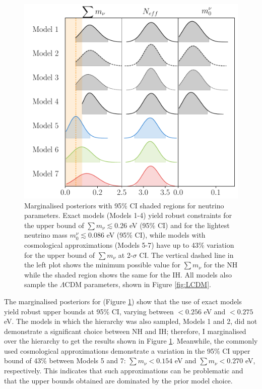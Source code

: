 \begin{figure}
\begin{center}
\includegraphics[scale=0.80]{Neutrino-FIGS/neutrino_prior_models.pdf}
\caption[Results for neutrino related parameters from the neutrino model prior analysis.]{Marginalised posteriors with 95\% CI shaded regions for neutrino parameters. Exact models (Models 1-4) yield  robust constraints for the upper bound of $\sum m_{\nu} \lesssim 0.26$ eV (95\% CI) and for the lightest neutrino mass $m_0^{\nu} \lesssim 0.086$ eV (95\% CI), while models with cosmological approximations (Models 5-7) have up to 43\% variation for the upper bound of $\sum m_{\nu}$ at 2-$\sigma$ CI. The vertical dashed line in the left plot shows the minimum possible value for $\sum m_{\nu}$ for the NH while the shaded region shows the same for the IH. All models also sample the $\Lambda$CDM parameters, shown in Figure \ref{fig:LCDM}.}
\label{fig:neutrinoCompare1}
\end{center}
\vspace{-2.5mm}
\end{figure}
\qquad The marginalised posteriors for \NM{} (Figure \ref{fig:neutrinoCompare1}) show that the use of exact models yield robust upper bounds at 95\% CI, varying between $< 0.256$ eV and $<0.275$ eV. The models in which the hierarchy was also sampled, Models 1 and 2, did not demonstrate a significant choice between NH and IH; therefore, I marginalised over the hierarchy to get the results shown in Figure \ref{fig:neutrinoCompare1}. Meanwhile, the commonly used cosmological approximations demonstrate a variation in the 95\% CI upper bound of 43\% between Models 5 and 7: $\sum m_{\nu} < 0.154$ eV and $\sum m_{\nu} < 0.270$ eV, respectively. This indicates that such approximations can be problematic and that the upper bounds obtained are dominated by the prior model choice.

